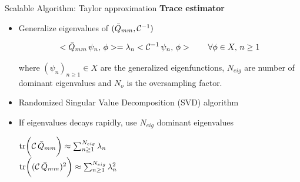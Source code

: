 \documentclass[10pt,xcolor=dvipsnames,compress]{beamer}
\begin{document}
\begin{frame}{Scalable Algorithm: Taylor approximation}
    \vfill
\textbf{Trace estimator}
\small 
\begin{itemize}


\item Generalize eigenvalues of $(\Bar{Q}_{mm},\mathcal{C}^{-1})$

        \begin{equation*}
            <\Bar{Q}_{mm}\,\psi_n,\,\phi>
            =
            \lambda_n
            <\mathcal{C}^{-1}\,\psi_n,\,\phi>  
            \qquad
            \forall\phi\in X,\, n\geq1
        \end{equation*}
        
        where $(\psi_n)_{n\geq1}\in X$ are the generalized eigenfunctions, $N_{eig}$ are number of dominant eigenvalues and $N_o$ is the oversampling factor. 
\end{itemize}

\vfill
\begin{itemize}
\item Randomized Singular Value Decomposition (SVD) algorithm 
\end{itemize}

\begin{minipage}{0.49\textwidth}
\begin{itemize}
    \item If eigenvalues decays rapidly, use $N_{eig}$ dominant eigenvalues \footnotemark
        
             $\mathrm{tr}\bigg(\mathcal{C}\,\Bar{Q}_{mm}\bigg)   \approx  \sum_{n\geq1}^{N_{eig}} \lambda_n$\\
            
             $\mathrm{tr}\bigg(       (\mathcal{C}\,\Bar{Q}_{mm})^2          \bigg) \approx \sum_{n\geq1}^{N_{eig}} \lambda_n^2$
        
        


\end{itemize}
\end{minipage}
\end{frame}
\end{document}
